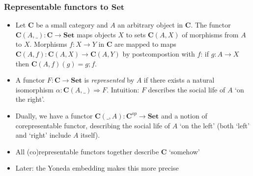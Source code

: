 \documentclass[handout]{beamer}
\newcommand{\To}{\Rightarrow}
\newcommand{\bfsf}[1]{{\boldsymbol{#1}}}
\newcommand{\Set}{\bfsf{Set}}
\newcommand{\CC}{\bfsf{C}}
\begin{document}
\frame
  {   
    \frametitle{Representable functors to $\Set$}\label{Yon:ReprFun}

 \begin{itemize}[<+->]
\item Let $\CC$ be a small category and $A$ an arbitrary object in $\CC$. 
The functor  $\CC(A,\_):\CC\to\Set$ maps objects $X$ to sets $\CC(A,X)$
of morphisms from $A$ to $X$. Morphisms $f: X\to Y$ in $\CC$ are
mapped to maps $\CC(A,f): \CC(A,X)\to\CC(A,Y)$ by
postcompostion with $f$: if $g:A\to X$ then $\CC(A,f)(g) = g;f$.
\item A functor $F:\CC\to\Set$ is \emph{represented} by $A$ if
there exists a natural isomorphism $\alpha: \CC(A,\_)\To F$.
Intuition: $F$ describes the social life of $A$ `on the right'.
\item Dually, we have a functor $\CC(\_,A):\CC^{op}\to\Set$
and a notion of corepresentable functor, 
describing the social life of $A$ `on the left' 
(both `left' and `right' include $A$ itself).
\item All (co)representable functors together describe $\CC$ `somehow'
\item Later: the Yoneda embedding makes this more precise

\end{itemize}

 }
\end{document}

